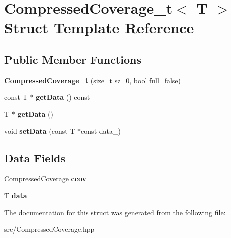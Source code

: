 \hypertarget{structCompressedCoverage__t}{}\section{Compressed\+Coverage\+\_\+t$<$ T $>$ Struct Template Reference}
\label{structCompressedCoverage__t}
\subsection*{Public Member Functions}
\begin{DoxyCompactItemize}
\item 
\mbox{\label{structCompressedCoverage__t_a53f9b09b618b4dfd0221ca36b1b97e61}} 
{\bfseries Compressed\+Coverage\+\_\+t} (size\+\_\+t sz=0, bool full=false)
\item 
\mbox{\label{structCompressedCoverage__t_aca6f7b45a5966730b42a40720d78c335}} 
const T $\ast$ {\bfseries get\+Data} () const
\item 
\mbox{\label{structCompressedCoverage__t_a8bde7988b8533d22081b740aac2a06ed}} 
T $\ast$ {\bfseries get\+Data} ()
\item 
\mbox{\label{structCompressedCoverage__t_adc8d87d20e694bbe699348518e5db4c0}} 
void {\bfseries set\+Data} (const T $\ast$const data\+\_\+)
\end{DoxyCompactItemize}
\subsection*{Data Fields}
\begin{DoxyCompactItemize}
\item 
\mbox{\label{structCompressedCoverage__t_a26c805f934769974411f9fa38567943c}} 
\hyperlink{classCompressedCoverage}{Compressed\+Coverage} {\bfseries ccov}
\item 
\mbox{\label{structCompressedCoverage__t_a38240dd282269194557fde76d7e98c93}} 
T {\bfseries data}
\end{DoxyCompactItemize}


The documentation for this struct was generated from the following file\+:\begin{DoxyCompactItemize}
\item 
src/Compressed\+Coverage.\+hpp\end{DoxyCompactItemize}
